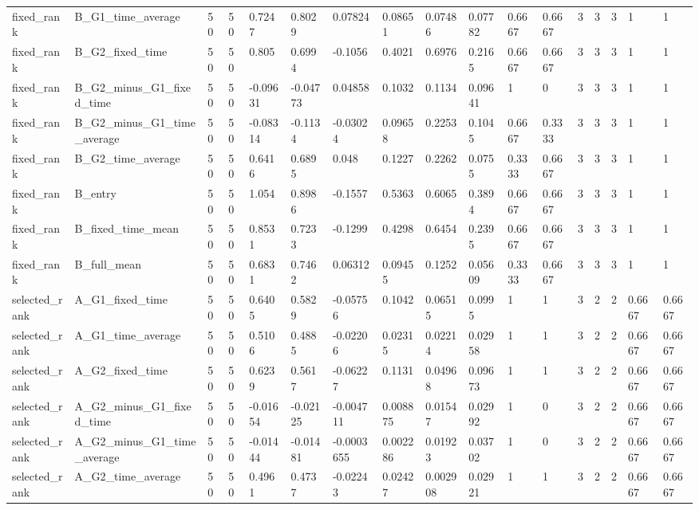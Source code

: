 \begin{longtable}{lllllllllllllllll}
fixed\_rank & B\_G1\_time\_average & 50 & 50 & 0.7247 & 0.8029 & 0.07824 & 0.08651 & 0.07486 & 0.07782 & 0.6667 & 0.6667 & 3 & 3 & 3 & 1 & 1 \\
fixed\_rank & B\_G2\_fixed\_time & 50 & 50 & 0.805 & 0.6994 & -0.1056 & 0.4021 & 0.6976 & 0.2165 & 0.6667 & 0.6667 & 3 & 3 & 3 & 1 & 1 \\
fixed\_rank & B\_G2\_minus\_G1\_fixed\_time & 50 & 50 & -0.09631 & -0.04773 & 0.04858 & 0.1032 & 0.1134 & 0.09641 & 1 & 0 & 3 & 3 & 3 & 1 & 1 \\
fixed\_rank & B\_G2\_minus\_G1\_time\_average & 50 & 50 & -0.08314 & -0.1134 & -0.03024 & 0.09658 & 0.2253 & 0.1045 & 0.6667 & 0.3333 & 3 & 3 & 3 & 1 & 1 \\
fixed\_rank & B\_G2\_time\_average & 50 & 50 & 0.6416 & 0.6895 & 0.048 & 0.1227 & 0.2262 & 0.0755 & 0.3333 & 0.6667 & 3 & 3 & 3 & 1 & 1 \\
fixed\_rank & B\_entry & 50 & 50 & 1.054 & 0.8986 & -0.1557 & 0.5363 & 0.6065 & 0.3894 & 0.6667 & 0.6667 & 3 & 3 & 3 & 1 & 1 \\
fixed\_rank & B\_fixed\_time\_mean & 50 & 50 & 0.8531 & 0.7233 & -0.1299 & 0.4298 & 0.6454 & 0.2395 & 0.6667 & 0.6667 & 3 & 3 & 3 & 1 & 1 \\
fixed\_rank & B\_full\_mean & 50 & 50 & 0.6831 & 0.7462 & 0.06312 & 0.09455 & 0.1252 & 0.05609 & 0.3333 & 0.6667 & 3 & 3 & 3 & 1 & 1 \\
selected\_rank & A\_G1\_fixed\_time & 50 & 50 & 0.6405 & 0.5829 & -0.05756 & 0.1042 & 0.06515 & 0.0995 & 1 & 1 & 3 & 2 & 2 & 0.6667 & 0.6667 \\
selected\_rank & A\_G1\_time\_average & 50 & 50 & 0.5106 & 0.4885 & -0.02206 & 0.02315 & 0.02214 & 0.02958 & 1 & 1 & 3 & 2 & 2 & 0.6667 & 0.6667 \\
selected\_rank & A\_G2\_fixed\_time & 50 & 50 & 0.6239 & 0.5617 & -0.06227 & 0.1131 & 0.04968 & 0.09673 & 1 & 1 & 3 & 2 & 2 & 0.6667 & 0.6667 \\
selected\_rank & A\_G2\_minus\_G1\_fixed\_time & 50 & 50 & -0.01654 & -0.02125 & -0.004711 & 0.008875 & 0.01547 & 0.02992 & 1 & 0 & 3 & 2 & 2 & 0.6667 & 0.6667 \\
selected\_rank & A\_G2\_minus\_G1\_time\_average & 50 & 50 & -0.01444 & -0.01481 & -0.0003655 & 0.002286 & 0.01923 & 0.03702 & 1 & 0 & 3 & 2 & 2 & 0.6667 & 0.6667 \\
selected\_rank & A\_G2\_time\_average & 50 & 50 & 0.4961 & 0.4737 & -0.02243 & 0.02427 & 0.002908 & 0.02921 & 1 & 1 & 3 & 2 & 2 & 0.6667 & 0.6667 \\

\end{longtable}

